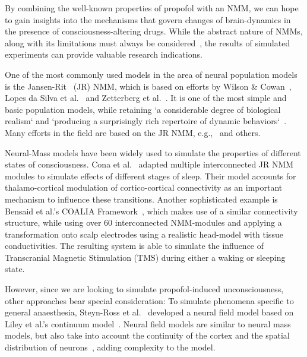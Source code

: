 By combining the well-known properties of propofol with an NMM, we can hope to gain insights into the mechanisms that
govern changes of brain-dynamics in the presence of consciousness-altering drugs.
While the abstract nature of NMMs, along with its limitations must always be
considered~\cite{deschle_validity_2021},
the results of simulated experiments can provide valuable research indications.

One of the most commonly used models in the area of neural population models is the
Jansen-Rit~\cite{jansen_electroencephalogram_1995} (JR) NMM,
which is based on efforts by Wilson \& Cowan~\cite{wilson_excitatory_1972},
Lopes da Silva et al.~\cite{lopes_da_silva_model_1974, lopes_da_silva_models_1976} and
Zetterberg et al.~\cite{zetterberg_performance_1978}.
It is one of the most simple and basic population models,
while retaining `a considerable degree of biological realism` and
`producing a surprisingly rich repertoire of dynamic behaviors`~\cite{knösche_jansen-rit_2014}.
Many efforts in the field are based on the JR NMM, e.g.,~\cite{wendling_relevance_2000, david_neural_2003,
    moran_dynamic_2009, spiegler_bifurcation_2010, cona_thalamo-cortical_2014, bensaid_coalia_2019} and others.

Neural-Mass models have been widely used to simulate the properties  of different states of
consciousness.
Cona et al.~\cite{cona_thalamo-cortical_2014} adapted multiple interconnected JR NMM modules to simulate effects
of different stages of sleep.
Their model accounts for thalamo-cortical modulation of cortico-cortical connectivity as an important mechanism to
influence these transitions.
Another sophisticated example is Bensaid et al.'s COALIA Framework~\cite{wendling_epileptic_2002, bensaid_coalia_2019},
which makes use of a similar connectivity structure, while using over 60 interconnected NMM-modules and applying a
transformation onto scalp electrodes using a realistic head-model with tissue conductivities.
The resulting system is able to simulate the influence of Transcranial Magnetic Stimulation (TMS) during either
a waking or sleeping state.

However, since we are looking to simulate propofol-induced unconsciousness, other approaches bear special
consideration:
To simulate phenomena specific to general anaesthesia,
Steyn-Ross et al.~\cite{steyn_ross_modelling_2004, hutt_progress_2011} developed a neural field model based
on Liley et al.'s continuum model~\cite{liley_continuum_1999}.
Neural field models are similar to neural mass models,
but also take into account the continuity of the cortex and the spatial distribution of
neurons~\cite{glomb_computational_2022}, adding complexity to the model.



